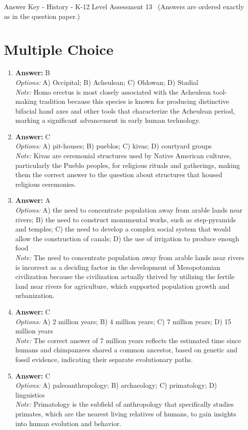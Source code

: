 \documentclass[12pt]{article}
\begin{document}
\begin{center}
Answer Key - History - K-12 Level Assessment 13 \
\small (Answers are ordered exactly as in the question paper.)
\end{center}

\section*{Multiple Choice}
\begin{enumerate}[label=\arabic*.]
\item \textbf{Answer:} B
\\ \textit{Options:} A) Occipital; B) Acheulean; C) Oldowan; D) Stadial
\\ \textit{Note:} Homo erectus is most closely associated with the Acheulean tool-making tradition because this species is known for producing distinctive bifacial hand axes and other tools that characterize the Acheulean period, marking a significant advancement in early human technology.
\item \textbf{Answer:} C
\\ \textit{Options:} A) pit-houses; B) pueblos; C) kivas; D) courtyard groups
\\ \textit{Note:} Kivas are ceremonial structures used by Native American cultures, particularly the Pueblo peoples, for religious rituals and gatherings, making them the correct answer to the question about structures that housed religious ceremonies.
\item \textbf{Answer:} A
\\ \textit{Options:} A) the need to concentrate population away from arable lands near rivers; B) the need to construct monumental works, such as step-pyramids and temples; C) the need to develop a complex social system that would allow the construction of canals; D) the use of irrigation to produce enough food
\\ \textit{Note:} The need to concentrate population away from arable lands near rivers is incorrect as a deciding factor in the development of Mesopotamian civilization because the civilization actually thrived by utilizing the fertile land near rivers for agriculture, which supported population growth and urbanization.
\item \textbf{Answer:} C
\\ \textit{Options:} A) 2 million years; B) 4 million years; C) 7 million years; D) 15 million years
\\ \textit{Note:} The correct answer of 7 million years reflects the estimated time since humans and chimpanzees shared a common ancestor, based on genetic and fossil evidence, indicating their separate evolutionary paths.
\item \textbf{Answer:} C
\\ \textit{Options:} A) paleoanthropology; B) archaeology; C) primatology; D) linguistics
\\ \textit{Note:} Primatology is the subfield of anthropology that specifically studies primates, which are the nearest living relatives of humans, to gain insights into human evolution and behavior.
\end{enumerate}
\end{document}

